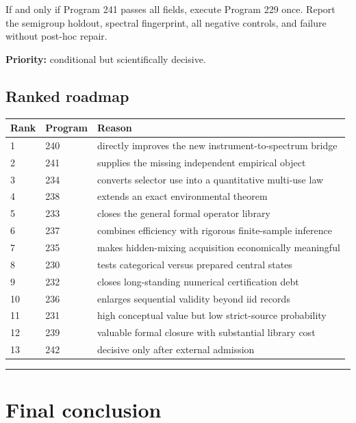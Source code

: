 \documentclass[11pt,a4paper,openany]{report}
\begin{document}
If and only if Program 241 passes all fields, execute Program 229 once. Report the semigroup holdout, spectral fingerprint, all negative controls, and failure without post-hoc repair.

\textbf{Priority:} conditional but scientifically decisive.

\section{Ranked roadmap}

\begin{center}
\begingroup\small
\setlength{\tabcolsep}{3.5pt}
\renewcommand{\arraystretch}{1.16}
\begin{longtable}{@{}p{}p{}p{}@{}}
\toprule
\textbf{Rank} & \textbf{Program} & \textbf{Reason} \\
\midrule
\endhead
1 & 240 & directly improves the new instrument-to-spectrum bridge \\
2 & 241 & supplies the missing independent empirical object \\
3 & 234 & converts selector use into a quantitative multi-use law \\
4 & 238 & extends an exact environmental theorem \\
5 & 233 & closes the general formal operator library \\
6 & 237 & combines efficiency with rigorous finite-sample inference \\
7 & 235 & makes hidden-mixing acquisition economically meaningful \\
8 & 230 & tests categorical versus prepared central states \\
9 & 232 & closes long-standing numerical certification debt \\
10 & 236 & enlarges sequential validity beyond iid records \\
11 & 231 & high conceptual value but low strict-source probability \\
12 & 239 & valuable formal closure with substantial library cost \\
13 & 242 & decisive only after external admission \\
\bottomrule
\end{longtable}
\endgroup
\end{center}

\par\medskip\hrule\medskip

\chapter{Final conclusion}
\end{document}
